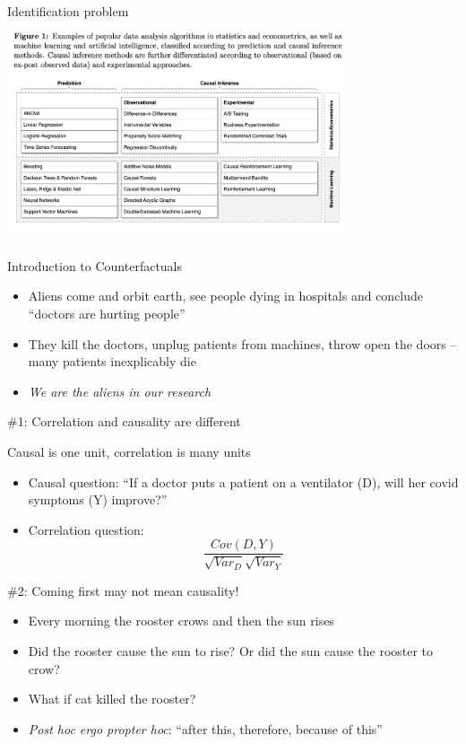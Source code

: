 \documentclass{beamer}
\begin{document}
\begin{frame}{Identification problem}
  \centering
  \includegraphics[scale=0.5,height=6.5cm, width=10cm]{./lecture_includes/prediction_causality.png}
\end{frame}




\begin{frame}{Introduction to Counterfactuals}

  \begin{itemize}
    \item Aliens come and orbit earth, see people dying in hospitals and conclude ``doctors are hurting people''
    \item They kill the doctors, unplug patients from machines, throw open the doors -- many patients inexplicably die
    \item \emph{We are the aliens in our research}
  \end{itemize}

\end{frame}

\begin{frame}{\#1: Correlation and causality are different}

  Causal is one unit, correlation is many units
  \begin{itemize}
    \item Causal question: ``If a doctor puts a patient on a ventilator (D), will her covid symptoms (Y) improve?''
    \item Correlation question:  $$\frac{Cov(D,Y)}{\sqrt{Var_D}\sqrt{{Var_Y}}}$$
  \end{itemize}

\end{frame}


\begin{frame}{\#2: Coming first may not mean causality!}

  \begin{itemize}
    \item Every morning the rooster crows and then the sun rises
    \item Did the rooster cause the sun to rise? Or did the sun cause the rooster to crow?
    \item What if cat killed the rooster?
    \item \emph{Post hoc ergo propter hoc}: ``after this, therefore, because of this''
  \end{itemize}

\end{frame}
\end{document}

